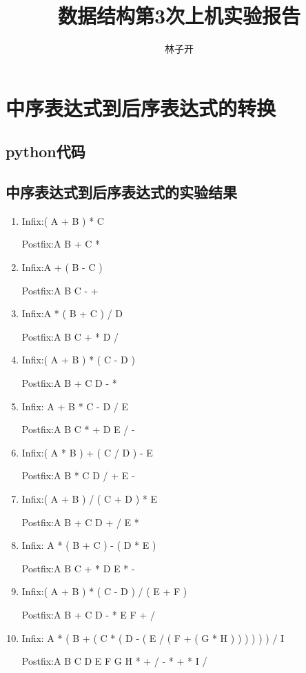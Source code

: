 \documentclass{article}
\title{数据结构第3次上机实验报告}
\author{林子开}
\begin{document}
	\maketitle
	\tableofcontents

\section{中序表达式到后序表达式的转换}
\subsection{python代码}



\subsection{中序表达式到后序表达式的实验结果}

\begin{enumerate}
	\item 
Infix:( A + B ) * C

Postfix:A B + C *

\item
Infix:A + ( B - C )

Postfix:A B C - +

\item
Infix:A * ( B + C ) / D

Postfix:A B C + * D /

\item
Infix:( A + B ) * ( C - D )

Postfix:A B + C D - *

\item 
Infix: A + B * C - D / E

Postfix:A B C * + D E / -

\item
Infix:( A * B ) + ( C / D ) - E

Postfix:A B * C D / + E -

\item
Infix:( A + B ) / ( C + D ) * E

Postfix:A B + C D + / E *

\item
Infix: A * ( B + C ) - ( D * E )

Postfix:A B C + * D E * -

\item
Infix:( A + B ) * ( C - D ) / ( E + F )

Postfix:A B + C D - * E F + /

\item
Infix: A * ( B + ( C * ( D - ( E / ( F + ( G * H ) ) ) ) ) )  / I

Postfix:A B C D E F G H * + / - * + * I /

\end{enumerate}
\end{document}
